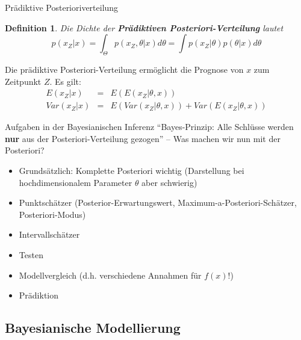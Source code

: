 \documentclass[german]{beamer}
\newtheorem{Bsp}{Beispiel}
\newtheorem{Def}{Definition}
\numberwithin{Bsp}{section}
\numberwithin{Def}{section}
\numberwithin{Stz}{section}
\begin{document}
\begin{frame}{}
\end{frame}

\begin{frame}{Prädiktive Posterioriverteilung}
\begin{Def}
Die Dichte der \textbf{Prädiktiven Posteriori-Verteilung} lautet
\[
p(x_Z|x)=\int_\Theta p(x_Z,\theta|x) d\theta = \int p(x_Z|\theta)p(\theta|x) d\theta 
\]
\end{Def}
Die prädiktive Posteriori-Verteilung ermöglicht die Prognose von $x$ zum Zeitpunkt $Z$. Es gilt:
\begin{eqnarray*}
E(x_Z|x) &=& E(E(x_Z|\theta,x))\\
Var(x_Z|x)&=& E(Var(x_Z|\theta,x))+Var(E(x_Z|\theta,x))
\end{eqnarray*}
\end{frame}

\begin{frame}{Aufgaben in der Bayesianischen Inferenz}
``Bayes-Prinzip: Alle Schlüsse werden \textbf{nur} aus der Posteriori-Verteilung gezogen'' -- Was machen wir nun mit der Posteriori?
\begin{itemize}
\item Grundsätzlich: Komplette Posteriori wichtig (Darstellung bei hochdimensionalem Parameter $\theta$ aber schwierig)
\item Punktschätzer (Posterior-Erwartungswert, Maximum-a-Posteriori-Schätzer, Posteriori-Modus)
\item Intervallschätzer
\item Testen
\item Modellvergleich (d.h. verschiedene Annahmen für $f(x)$!)
\item Prädiktion
\end{itemize}
\end{frame}

\subsection{Bayesianische Modellierung}
\end{document}
